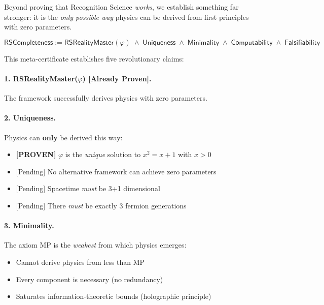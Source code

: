 \documentclass[11pt,a4paper,twoside]{article}
\numberwithin{equation}{section}
\theoremstyle{customthm}
\theoremstyle{customdef}
\theoremstyle{customrem}
\begin{document}
Beyond proving that Recognition Science \emph{works}, we establish something far stronger: it is the \emph{only possible way} physics can be derived from first principles with zero parameters.

\begin{importantbox}
\begin{equation}
\boxed{
\mathsf{RSCompleteness} := \mathsf{RSRealityMaster}(\varphi) \;\land\; \mathsf{Uniqueness} \;\land\; \mathsf{Minimality} \;\land\; \mathsf{Computability} \;\land\; \mathsf{Falsifiability}
}
\label{eq:completeness}
\end{equation}
\end{importantbox}

This meta-certificate establishes five revolutionary claims:

\paragraph{1. RSRealityMaster($\varphi$) [Already Proven].} The framework successfully derives physics with zero parameters.

\paragraph{2. Uniqueness.} Physics can \textbf{only} be derived this way:
\begin{itemize}[leftmargin=*,topsep=2pt,itemsep=2pt]
\item {\color{green!60!black}\textbf{[PROVEN]}} $\varphi$ is the \emph{unique} solution to $x^2 = x + 1$ with $x > 0$
\item {\color{orange!70!black}[Pending]} No alternative framework can achieve zero parameters
\item {\color{orange!70!black}[Pending]} Spacetime \emph{must} be 3+1 dimensional
\item {\color{orange!70!black}[Pending]} There \emph{must} be exactly 3 fermion generations
\end{itemize}

\paragraph{3. Minimality.} The axiom MP is the \emph{weakest} from which physics emerges:
\begin{itemize}[leftmargin=*,topsep=2pt,itemsep=2pt]
\item Cannot derive physics from less than MP
\item Every component is necessary (no redundancy)
\item Saturates information-theoretic bounds (holographic principle)
\end{itemize}
\end{document}

